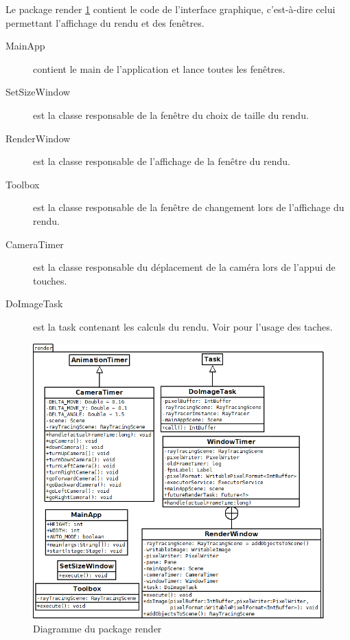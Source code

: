 Le package render \ref{diagRender} contient le code de l'interface graphique, c'est-à-dire celui permettant l'affichage du rendu et des fenêtres.

\begin{description}
    \item [MainApp] contient le main de l'application et lance toutes les fenêtres.
    \item [SetSizeWindow] est la classe responsable de la fenêtre du choix de taille du rendu.
    \item [RenderWindow] est la classe responsable de l'affichage de la fenêtre du rendu.
    \item [Toolbox] est la classe responsable de la fenêtre de changement lors de l'affichage du rendu.
    \item [CameraTimer] est la classe responsable du déplacement de la caméra lors de l'appui de touches.
    \item [DoImageTask] est la task contenant les calculs du rendu. Voir  pour l'usage des taches.
\end{description}



\begin{figure}[h]
   \begin{center}
       \includegraphics[scale=0.5]{img/render.javafx/diagClassRender.png}
   \end{center}
   \caption{Diagramme du package render \label{diagRender}}
\end{figure}
\FloatBarrier

